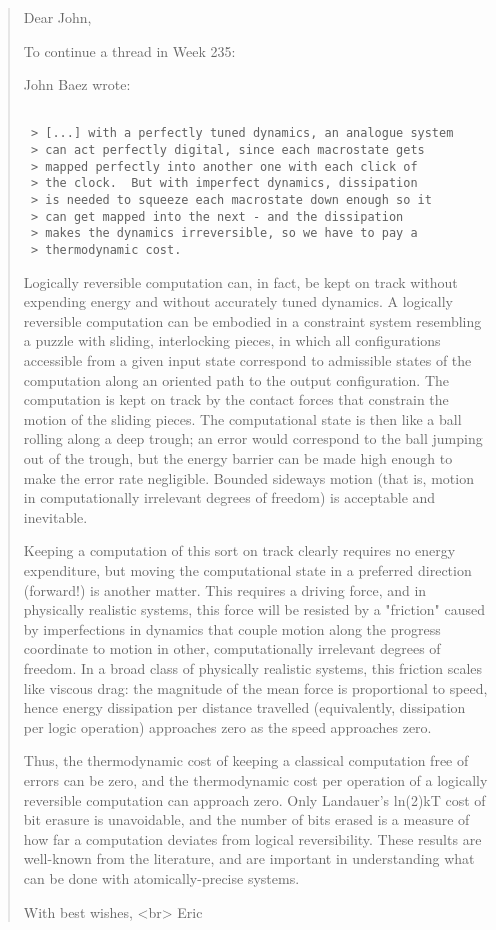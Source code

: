 \begin{quote}
Dear John,

To continue a thread in Week 235:

John Baez wrote:


\begin{verbatim}

 > [...] with a perfectly tuned dynamics, an analogue system 
 > can act perfectly digital, since each macrostate gets 
 > mapped perfectly into another one with each click of 
 > the clock.  But with imperfect dynamics, dissipation 
 > is needed to squeeze each macrostate down enough so it 
 > can get mapped into the next - and the dissipation 
 > makes the dynamics irreversible, so we have to pay a 
 > thermodynamic cost.  
\end{verbatim}
    

Logically reversible computation can, in fact, be kept on track  
without expending energy and without accurately tuned dynamics. A  
logically reversible computation can be embodied in a constraint  
system resembling a puzzle with sliding, interlocking pieces, in  
which all configurations accessible from a given input state  
correspond to admissible states of the computation along an oriented  
path to the output configuration. The computation is kept on track by  
the contact forces that constrain the motion of the sliding pieces.  
The computational state is then like a ball rolling along a deep  
trough; an error would correspond to the ball jumping out of the  
trough, but the energy barrier can be made high enough to make the  
error rate negligible. Bounded sideways motion (that is, motion in  
computationally irrelevant degrees of freedom) is acceptable and  
inevitable.

Keeping a computation of this sort on track clearly requires no  
energy expenditure, but moving the computational state in a preferred  
direction (forward!) is another matter. This requires a driving  
force, and in physically realistic systems, this force will be  
resisted by a "friction" caused by imperfections in dynamics that  
couple motion along the progress coordinate to motion in other,  
computationally irrelevant degrees of freedom. In a broad class of  
physically realistic systems, this friction scales like viscous drag:  
the magnitude of the mean force is proportional to speed, hence  
energy dissipation per distance travelled (equivalently, dissipation  
per logic operation) approaches zero as the speed approaches zero.

Thus, the thermodynamic cost of keeping a classical computation free  
of errors can be zero, and the thermodynamic cost per operation of a  
logically reversible computation can approach zero. Only Landauer's 
ln(2)kT cost of bit erasure is unavoidable, and the number of bits  
erased is a measure of how far a computation deviates from logical  
reversibility. These results are well-known from the literature, and  
are important in understanding what can be done with atomically-precise 
systems.

With best wishes, <br>
Eric
\end{quote}

